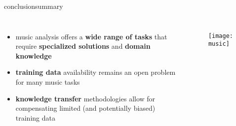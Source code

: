 \begin{frame}{conclusion}{summary}
		\begin{columns}
						\begin{itemize}
								\item music analysis offers a \textbf{wide range of tasks} that require \textbf{specialized solutions} and \textbf{domain knowledge}
								
								\bigskip
								\item \textbf{training data} availability remains an open problem for many music tasks
								
								\bigskip
								\item \textbf{knowledge transfer} methodologies allow for compensating limited (and potentially biased) training data
						\end{itemize}
						\begin{figure}
								\texttt{[image: music]}
						\end{figure}
		\end{columns}
\end{frame}

